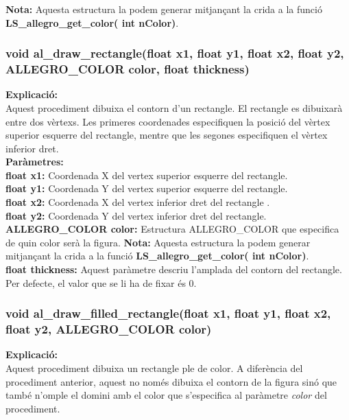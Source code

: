 \documentclass[11pt]{article}
\begin{document}
\noindent \textbf{Nota:} Aquesta estructura la podem generar mitjançant la crida a la funció \textbf{ LS\_allegro\_get\_color( int nColor)}.\\

\newpage	
\subsubsection{void al\_draw\_rectangle(float x1, float y1, float x2, float y2, ALLEGRO\_COLOR color, float thickness)}
\textbf{Explicació:}\\
Aquest procediment dibuixa el contorn d'un rectangle. El rectangle es dibuixarà entre dos vèrtexs. Les primeres coordenades especifiquen la posició del vèrtex superior esquerre del rectangle, mentre que les segones especifiquen el vèrtex inferior dret.\\

\noindent \textbf{Paràmetres:}\\
\textbf{float x1:} Coordenada X del vertex superior esquerre del rectangle.\\
\textbf{float y1:} Coordenada Y del vertex superior esquerre del rectangle.\\
\textbf{float x2:} Coordenada X del vertex inferior dret del rectangle .\\
\textbf{float y2:} Coordenada Y del vertex inferior dret del rectangle.\\
\textbf{ALLEGRO\_COLOR color:} Estructura ALLEGRO\_COLOR que especifica de quin color serà la figura. 
\noindent \textbf{Nota:} Aquesta estructura la podem generar mitjançant la crida a la funció \textbf{LS\_allegro\_get\_color( int nColor)}.\\

\noindent\textbf{float thickness:} Aquest paràmetre descriu l'amplada del contorn del rectangle. Per defecte, el valor que se li ha de fixar és 0.\\

\pagebreak		
\subsubsection{void al\_draw\_filled\_rectangle(float x1, float y1, float x2, float y2, ALLEGRO\_COLOR color)}
\textbf{Explicació:}\\
Aquest procediment dibuixa un rectangle ple de color. A diferència del procediment anterior, aquest no només dibuixa el contorn de la figura sinó que també n'omple el domini amb el color que s'especifica al paràmetre \textit{color} del procediment.
\end{document}
